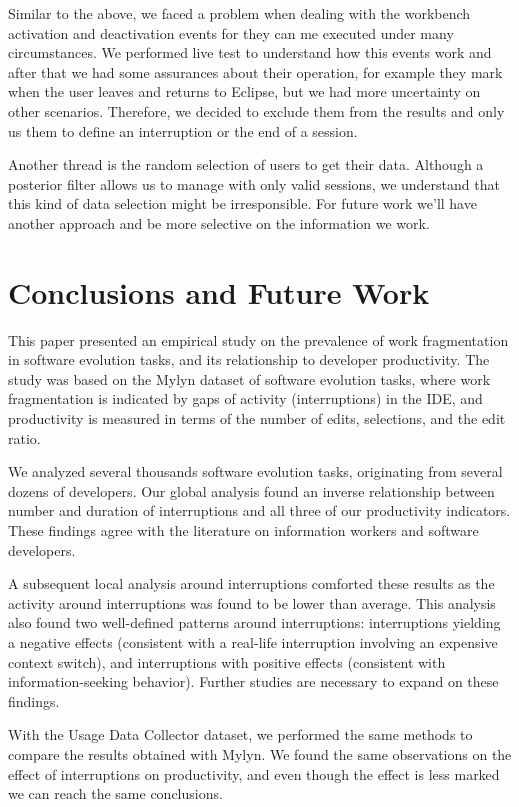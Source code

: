 \documentclass[times]{smrauth}
\begin{document}
Similar to the above, we faced a problem when dealing with the workbench activation and deactivation events for they can me executed under many circumstances. We performed live test to understand how this events work and after that we had some assurances about their operation, for example they mark when the user leaves and returns to Eclipse, but we had more uncertainty on other scenarios. Therefore, we decided to exclude them from the results and only us them to define an interruption or the end of a session.

Another thread is the random selection of users to get their data. Although a posterior filter allows us to manage with only valid sessions, we understand that this kind of data selection might be irresponsible. For future work we'll have another approach and be more selective on the information we work.


\section{Conclusions and Future Work}
This paper presented an empirical study on the prevalence of work fragmentation in software evolution tasks, and its relationship to developer productivity. The study was based on the Mylyn dataset of software evolution tasks, where work fragmentation is indicated by gaps of activity (interruptions) in the IDE, and productivity is measured in terms of the number of edits, selections, and the edit ratio.

We analyzed several thousands software evolution tasks, originating from several dozens of developers. Our global analysis found an inverse relationship between number and duration of interruptions and all three of our productivity indicators. These findings agree with the literature on information workers and software developers. 

A subsequent local analysis around interruptions comforted these results as the activity around interruptions was found to be lower than average. This analysis also found two well-defined patterns around interruptions: interruptions yielding a negative effects (consistent with a real-life interruption involving an expensive context switch), and interruptions with positive effects (consistent with information-seeking behavior). Further studies are necessary to expand on these findings.

With the Usage Data Collector dataset, we performed the same methods to compare the results obtained with Mylyn. We found the same observations on the effect of interruptions on productivity, and even though the effect is less marked we can reach the same conclusions.
\end{document}
